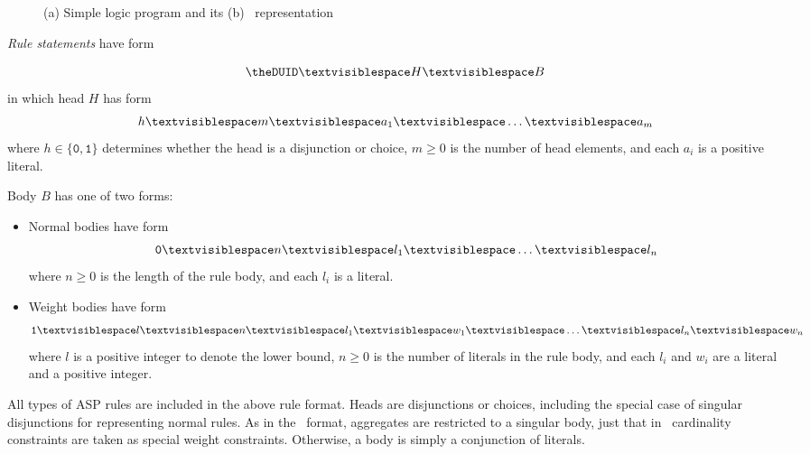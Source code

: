 \begin{wrapfigure}{r}{0.4\textwidth}
\vspace{-15pt}%
{\begin{minipage}[t]{0.15\textwidth}
%
\end{minipage}}%
\hfill%
{\begin{minipage}[t]{0.2\textwidth}
%
\end{minipage}}%
\caption{\label{prg:ezy}(a) Simple logic program and its (b) \aspif\ representation}
\vspace{10pt}%
\end{wrapfigure}
%
%
\newcommand{\myparagraph}[1]{\par\emph{#1}}
\myparagraph{Rule statements} have form
\addtocounter{DUID}{1}
\[\texttt{\theDUID} \Space H \Space B\]
in which head $H$ has form
\[h \Space m \Space a_1 \Space \dots \Space a_m\]
where
$h \in \{\texttt{0},\texttt{1}\}$ determines whether the head is a disjunction or choice,
$m \geq 0$ is the number of head elements, and
each $a_i$ is a positive literal.

Body $B$ has one of two forms:
\begin{itemize}
\item Normal bodies have form
  \[\texttt{0} \Space n \Space l_{1} \Space \dots \Space l_n\]
  where
  $n \geq 0$ is the length of the rule body, and
  each $l_i$ is a literal.
\item Weight bodies have form
  \[\texttt{1} \Space l \Space n \Space l_1 \Space w_1  \Space \dots \Space l_n \Space w_n\]
  where
  $l$ is a positive integer to denote the lower bound,
  $n \geq 0$ is the number of literals in the rule body, and
  each $l_i$ and $w_i$ are a literal and a positive integer.
\end{itemize}
All types of ASP rules are included in the above rule format.
Heads are disjunctions or choices, including the special case of singular disjunctions for representing normal rules.
As in the \smodels\ format,
aggregates are restricted to a singular body, just that in \aspif\ cardinality constraints are taken as special weight constraints.
Otherwise, a body is simply a conjunction of literals.

